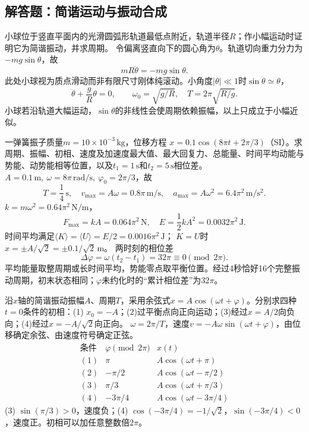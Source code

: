\subsection{解答题：简谐运动与振动合成}

\problemtext 小球位于竖直平面内的光滑圆弧形轨道最低点附近，轨道半径$R$；作小幅运动时证明它为简谐振动，并求周期。
\workings
令偏离竖直向下的圆心角为$\theta$。轨道切向重力分力为$-mg\sin\theta$，故
\[
mR\ddot\theta=-mg\sin\theta.
\]
此处小球视为质点滑动而非有限尺寸刚体纯滚动。小角度$|\theta|\ll1$时$\sin\theta\simeq\theta$，
\[
\ddot\theta+\frac gR\theta=0,\qquad
\boxed{\omega_0=\sqrt{g/R}},\quad
\boxed{T=2\pi\sqrt{R/g}}.
\]
\crosscheck 小球若沿轨道大幅运动，$\sin\theta$的非线性会使周期依赖振幅，以上只成立于小幅近似。

\problemtext 一弹簧振子质量$m=10\times10^{-3}\,\mathrm{kg}$，位移方程
$x=0.1\cos(8\pi t+2\pi/3)$（SI）。求周期、振幅、初相、速度及加速度最大值、最大回复力、总能量、时间平均动能与势能、动势能相等位置，以及$t_1=1\,\mathrm s$和$t_2=5\,\mathrm s$相位差。
\workings
$A=0.1\,\mathrm m,\ \omega=8\pi\,\mathrm{rad/s},\
\varphi_0=2\pi/3$，故
\[
\boxed{T=\frac14\,\mathrm s},\quad
\boxed{v_{\max}=A\omega=0.8\pi\,\mathrm{m/s}},\quad
\boxed{a_{\max}=A\omega^2=6.4\pi^2\,\mathrm{m/s^2}}.
\]
$k=m\omega^2=0.64\pi^2\,\mathrm{N/m}$，
\[
\boxed{F_{\max}=kA=0.064\pi^2\,\mathrm N},\quad
\boxed{E=\frac12kA^2=0.0032\pi^2\,\mathrm J}.
\]
时间平均满足$\langle K\rangle=\langle U\rangle=E/2=0.0016\pi^2\,\mathrm J$；
$K=U$时$x=\pm A/\sqrt2=\pm0.1/\sqrt2\,\mathrm m$。
两时刻的相位差
\[
\boxed{\Delta\varphi=\omega(t_2-t_1)=32\pi
\equiv0\pmod{2\pi}}.
\]
\crosscheck 平均能量取整周期或长时间平均，势能零点取平衡位置。经过4秒恰好16个完整振动周期，初末状态相同；$\varphi$未约化时的“累计相位差”为$32\pi$。

\problemtext 沿$x$轴的简谐振动振幅$A$、周期$T$，采用余弦式$x=A\cos(\omega t+\varphi)$。分别求四种$t=0$条件的初相：(1) $x_0=-A$；(2)过平衡点向正向运动；(3)经过$x=A/2$向负向；(4)经过$x=-A/\sqrt2$向正向。
\workings
$\omega=2\pi/T$，速度$v=-A\omega\sin(\omega t+\varphi)$，由位移确定余弦、由速度符号确定正弦。
\[
\begin{array}{c|c|l}
\text{条件}&\varphi\pmod{2\pi}&x(t)\\ \hline
(1)&\pi&A\cos(\omega t+\pi)\\
(2)&-\pi/2&A\cos(\omega t-\pi/2)\\
(3)&\pi/3&A\cos(\omega t+\pi/3)\\
(4)&-3\pi/4&A\cos(\omega t-3\pi/4)
\end{array}
\]
\crosscheck (3) $\sin(\pi/3)>0$，速度负；(4) $\cos(-3\pi/4)=-1/\sqrt2$，$\sin(-3\pi/4)<0$，速度正。初相可以加任意整数倍$2\pi$。

